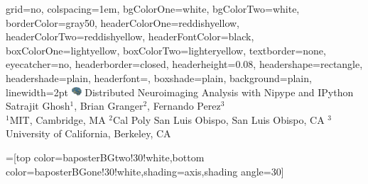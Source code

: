 \documentclass[portrait,final]{baposter}
\begin{document}
\newlength{\leftimgwidth}
\begin{poster}%
  {
  grid=no,
  colspacing=1em,
  bgColorOne=white,
  bgColorTwo=white,
  borderColor=gray50,
  headerColorOne=reddishyellow,
  headerColorTwo=reddishyellow,
  headerFontColor=black,
  boxColorOne=lightyellow,
  boxColorTwo=lighteryellow,
  textborder=none,
  eyecatcher=no,
  headerborder=closed,
  headerheight=0.08\textheight,
  headershape=rectangle,
  headershade=plain,
  headerfont=\Large\textsf, %
  boxshade=plain,
  background=plain,
  linewidth=2pt
  }
  {\includegraphics[width=1em]{nipylogo}} %
  {\sf %
  Distributed Neuroimaging Analysis with Nipype and IPython}
  {\sf %
  Satrajit Ghosh$^1$, Brian Granger$^2$, Fernando Perez$^3$\\
  $^1$MIT, Cambridge, MA $^2$Cal Poly San Luis Obispo, San Luis Obispo, CA $^3$University of California, Berkeley, CA}


  =[top color=baposterBGtwo!30!white,bottom color=baposterBGone!30!white,shading=axis,shading angle=30]

     \setlength{\leftimgwidth}{0.78em+8.0em}

    \newcommand{\colouredcircle}[1]{%
      \tikz{\useasboundingbox (-0.2em,-0.32em) rectangle(0.2em,0.32em); \draw[draw=black,fill=baposterBGone!80!black!#1!white,line width=0.03em] (0,0) circle(0.18em);}}


\end{poster}
\end{document}
